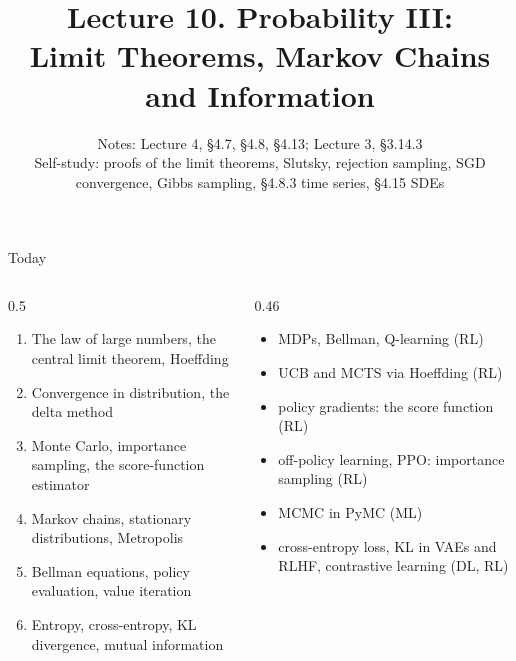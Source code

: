 \documentclass[aspectratio=1610,11pt]{beamer}
\title[Lecture 10 · Probability III]{Lecture 10. Probability III:\\ Limit Theorems, Markov Chains and Information}
\subtitle{Notes: Lecture 4, \S4.7, \S4.8, \S4.13; Lecture 3, \S3.14.3\\ Self-study: proofs of the limit theorems, Slutsky, rejection sampling, SGD convergence, Gibbs sampling, \S4.8.3 time series, \S4.15 SDEs}
\begin{document}
\begin{frame}[plain]
    \titlepage
\end{frame}

\begin{frame}{Today}
    \begin{columns}[T]
        \begin{column}{0.5\linewidth}
            \begin{enumerate}\small
                \item The law of large numbers, the central limit theorem, Hoeffding
                \item Convergence in distribution, the delta method
                \item Monte Carlo, importance sampling, the score-function estimator
                \item Markov chains, stationary distributions, Metropolis
                \item Bellman equations, policy evaluation, value iteration
                \item Entropy, cross-entropy, KL divergence, mutual information
            \end{enumerate}
        \end{column}
        \begin{column}{0.46\linewidth}
            \begin{mlbox}[Used in]
                \scriptsize
                \begin{itemize}
                    \item MDPs, Bellman, Q-learning (RL)
                    \item UCB and MCTS via Hoeffding (RL)
                    \item policy gradients: the score function (RL)
                    \item off-policy learning, PPO: importance sampling (RL)
                    \item MCMC in PyMC (ML)
                    \item cross-entropy loss, KL in VAEs and RLHF, contrastive learning (DL, RL)
                \end{itemize}
            \end{mlbox}
        \end{column}
    \end{columns}
\end{frame}

\end{document}
